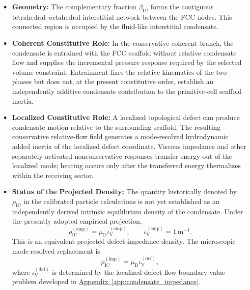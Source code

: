 \begin{itemize}
    \begin{itemize}

        \item \textbf{Geometry:}
        The complementary fraction $\beta_{\mathrm{IC}}$ forms the contiguous tetrahedral--octahedral interstitial network between the FCC nodes. This connected region is occupied by the fluid-like interstitial condensate.

        \item \textbf{Coherent Constitutive Role:}
        In the conservative coherent branch, the condensate is entrained with the FCC scaffold without relative condensate flow and supplies the incremental pressure response required by the selected volume constraint. Entrainment fixes the relative kinematics of the two phases but does not, at the present constitutive order, establish an independently additive condensate contribution to the primitive-cell scaffold inertia.

        \item \textbf{Localized Constitutive Role:}
        A localized topological defect can produce condensate motion relative to the surrounding scaffold. The resulting conservative relative-flow field generates a mode-resolved hydrodynamic added inertia of the localized defect coordinate. Viscous impedance and other separately activated nonconservative responses transfer energy out of the localized mode; heating occurs only after the transferred energy thermalizes within the receiving sector.

        \item \textbf{Status of the Projected Density:}
        The quantity historically denoted by $\rho_{\mathrm{IC}}$ in the calibrated particle calculations is not yet established as an independently derived intrinsic equilibrium density of the condensate. Under the presently adopted empirical projection,
        \begin{equation}
            \rho_{\mathrm{IC}}^{(\mathrm{emp})} = \mu_{\mathrm{D}}\iota_{\mathrm{V}}^{(\mathrm{emp})}, \qquad \iota_{\mathrm{V}}^{(\mathrm{emp})} = 1\,\mathrm{m}^{-1}.
            \label{eq:sec34_empirical_condensate_density}
        \end{equation}
        This is an equivalent projected defect-impedance density. The microscopic mode-resolved replacement is
        \begin{equation}
            \rho_{\mathrm{IC}}^{(\mathrm{imp})} = \mu_{\mathrm{D}}\iota_{\mathrm{V}}^{(\mathrm{def})},
        \end{equation}
        where $\iota_{\mathrm{V}}^{(\mathrm{def})}$ is determined by the localized defect-flow boundary-value problem developed in \hyperref[app:condensate_impedance]{Appendix~\ref*{app:condensate_impedance}}.

    \end{itemize}

\end{itemize}

